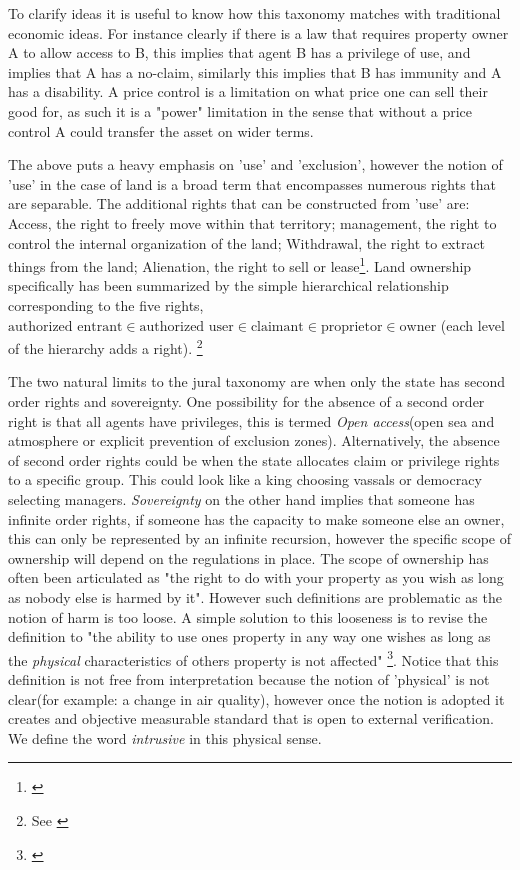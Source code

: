 \documentclass[12pt]{report}
\numberwithin{equation}{section}
\begin{document}
To clarify ideas it is useful to know how this taxonomy matches with traditional economic ideas. For instance clearly if there is a law that requires property owner A to allow access to B, this implies that agent B has a privilege of use, and implies that A has a no-claim, similarly this implies that B has immunity and A has a disability. A price control is a limitation on what price one can sell their good for, as such it is a "power" limitation in the sense that without a price control A could transfer the asset on wider terms.

The above puts a heavy emphasis on 'use' and 'exclusion', however the notion of 'use' in the case of land is a broad term that encompasses numerous rights that are separable. The additional rights that can be constructed from 'use' are: Access, the right to freely move within that territory; management, the right to control the internal organization of the land; Withdrawal, the right to extract things from the land; Alienation, the right to sell or lease\footnote{\cite{ostrom2010private}}.
Land ownership specifically has been summarized by the simple hierarchical relationship corresponding to the five rights, $\text{authorized entrant} \in \text{authorized user}  \in \text{claimant}  \in \text{proprietor} \in \text{owner}$ (each level of the hierarchy adds a right). \footnote{See \cite{schlager1992property}}


The two natural limits to the jural taxonomy are when only the state has second order rights and sovereignty. One possibility for the absence of a second order right is that all agents have privileges, this is termed \textit{Open access}(open sea and atmosphere or explicit prevention of exclusion zones). Alternatively, the absence of second order rights could be when the state allocates claim or privilege rights to a specific group. This could look like a king choosing vassals or democracy selecting managers. \textit{Sovereignty} on the other hand implies that someone has infinite order rights, if someone has the capacity to make someone else an owner, this can only be represented by an infinite recursion, however the specific scope of ownership will depend on the regulations in place. The scope of ownership has often been articulated as "the right to do with your property as you wish as long as nobody else is harmed by it". However such definitions are problematic as the notion of harm is too loose. A simple solution to this looseness is to revise the definition to "the ability to use ones property in any way one wishes as long as the \textit{physical} characteristics of others property is not affected" \footnote{\cite{Alchian1965}}. Notice that this definition is not free from interpretation because the notion of 'physical' is not clear(for example: a change in air quality), however once the notion is adopted it creates and objective measurable standard that is open to external verification. We define the word \textit{intrusive} in this physical sense.
\end{document}
